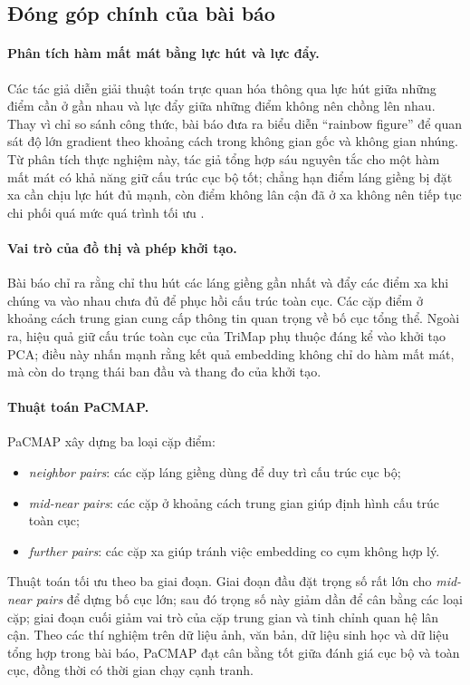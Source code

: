 \subsection{Đóng góp chính của bài báo}

\paragraph{Phân tích hàm mất mát bằng lực hút và lực đẩy.}
Các tác giả diễn giải thuật toán trực quan hóa thông qua lực hút giữa những
điểm cần ở gần nhau và lực đẩy giữa những điểm không nên chồng lên nhau.
Thay vì chỉ so sánh công thức, bài báo đưa ra biểu diễn ``rainbow figure''
để quan sát độ lớn gradient theo khoảng cách trong không gian gốc và không
gian nhúng. Từ phân tích thực nghiệm này, tác giả tổng hợp sáu nguyên tắc
cho một hàm mất mát có khả năng giữ cấu trúc cục bộ tốt; chẳng hạn điểm
láng giềng bị đặt xa cần chịu lực hút đủ mạnh, còn điểm không lân cận đã ở
xa không nên tiếp tục chi phối quá mức quá trình tối ưu
\cite{wang2021pacmap}.

\paragraph{Vai trò của đồ thị và phép khởi tạo.}
Bài báo chỉ ra rằng chỉ thu hút các láng giềng gần nhất và đẩy các điểm xa
khi chúng va vào nhau chưa đủ để phục hồi cấu trúc toàn cục. Các cặp điểm
ở khoảng cách trung gian cung cấp thông tin quan trọng về bố cục tổng thể.
Ngoài ra, hiệu quả giữ cấu trúc toàn cục của TriMap phụ thuộc đáng kể vào
khởi tạo PCA; điều này nhấn mạnh rằng kết quả embedding không chỉ do hàm
mất mát, mà còn do trạng thái ban đầu và thang đo của khởi tạo.

\paragraph{Thuật toán PaCMAP.}
PaCMAP xây dựng ba loại cặp điểm:
\begin{itemize}
  \item \textit{neighbor pairs}: các cặp láng giềng dùng để duy trì cấu
  trúc cục bộ;
  \item \textit{mid-near pairs}: các cặp ở khoảng cách trung gian giúp định
  hình cấu trúc toàn cục;
  \item \textit{further pairs}: các cặp xa giúp tránh việc embedding co cụm
  không hợp lý.
\end{itemize}
Thuật toán tối ưu theo ba giai đoạn. Giai đoạn đầu đặt trọng số rất lớn cho
\textit{mid-near pairs} để dựng bố cục lớn; sau đó trọng số này giảm dần
để cân bằng các loại cặp; giai đoạn cuối giảm vai trò của cặp trung gian và tinh chỉnh
quan hệ lân cận. Theo các thí nghiệm trên dữ liệu ảnh, văn bản, dữ liệu
sinh học và dữ liệu tổng hợp trong bài báo, PaCMAP đạt cân bằng tốt giữa
đánh giá cục bộ và toàn cục, đồng thời có thời gian chạy cạnh tranh.

